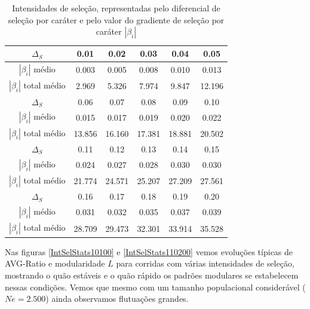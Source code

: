 \begin{table}[htbp]
    \centering
    \caption{Intensidades de seleção, representadas pelo diferencial de
        seleção por caráter e pelo valor do gradiente de seleção por caráter
    $|\beta_i|$}
    \label{tab:betas}
    \vspace{1em}
    \begin{tabular}{c|c|c|c|c|c}
        \toprule
        $\Delta_S$ & 0.01 & 0.02 & 0.03 & 0.04 & 0.05 \\
        \hline
        $|\beta_i|$ médio & 0.003 & 0.005 & 0.008 & 0.010 & 0.013 \\
         $|\beta_i|$ total médio & 2.969 & 5.326 & 7.974 & 9.847 & 12.196 \\
        \midrule
        \midrule
        $\Delta_S$ & 0.06 & 0.07 & 0.08 & 0.09 & 0.10 \\
        \hline
        $|\beta_i|$ médio & 0.015 & 0.017 & 0.019 & 0.020 & 0.022 \\
         $|\beta_i|$ total médio & 13.856 & 16.160 & 17.381 & 18.881 & 20.502 \\
        \midrule
        \midrule
        $\Delta_S$ & 0.11  & 0.12  & 0.13  & 0.14  & 0.15 \\ 
        \hline
        $|\beta_i|$ médio & 0.024 & 0.027 & 0.028 & 0.030 & 0.030 \\     
         $|\beta_i|$ total médio & 21.774 & 24.571 & 25.207 & 27.209 & 27.561 \\
        \midrule
        \midrule
        $\Delta_S$ & 0.16  & 0.17  & 0.18  & 0.19  & 0.20  \\ 
        \hline
        $|\beta_i|$ médio & 0.031 & 0.032 & 0.035 & 0.037 & 0.039 \\     
       $|\beta_i|$ total médio & 28.709 & 29.473 & 32.301 & 33.914 & 35.528 \\
        \bottomrule
    \end{tabular}
\end{table}

Nas figuras \ref{IntSelStats10100} e \ref{IntSelStats110200} vemos
evoluções típicas de AVG-Ratio e modularidade $L$ para corridas com
várias intensidades de seleção, mostrando o quão estáveis e o quão
rápido os padrões modulares se estabelecem nessas condições.
Vemos que mesmo com um tamanho populacional considerável ($Ne = 2.500$)
ainda observamos flutuações grandes.

